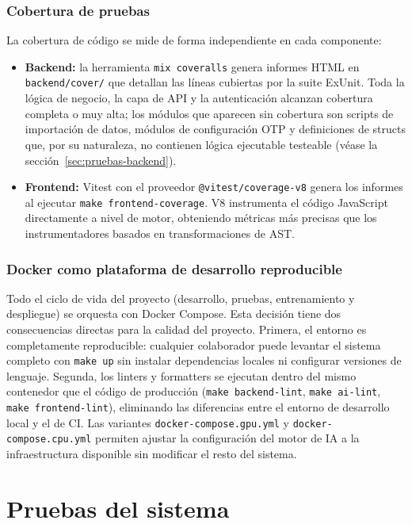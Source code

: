 \subsubsection{Cobertura de pruebas}

La cobertura de código se mide de forma independiente en cada componente:

\begin{itemize}
 \item \textbf{Backend:} la herramienta \texttt{mix coveralls} genera informes HTML en \texttt{backend/cover/} que detallan las líneas cubiertas por la suite ExUnit. Toda la lógica de negocio, la capa de API y la autenticación alcanzan cobertura completa o muy alta; los módulos que aparecen sin cobertura son scripts de importación de datos, módulos de configuración OTP y definiciones de structs que, por su naturaleza, no contienen lógica ejecutable testeable (véase la sección~\ref{sec:pruebas-backend}).
 \item \textbf{Frontend:} Vitest con el proveedor \texttt{@vitest/coverage-v8} genera los informes al ejecutar \texttt{make frontend-coverage}. V8 instrumenta el código JavaScript directamente a nivel de motor, obteniendo métricas más precisas que los instrumentadores basados en transformaciones de AST.
\end{itemize}

\subsubsection{Docker como plataforma de desarrollo reproducible}

Todo el ciclo de vida del proyecto (desarrollo, pruebas, entrenamiento y despliegue) se orquesta con Docker Compose. Esta decisión tiene dos consecuencias directas para la calidad del proyecto. Primera, el entorno es completamente reproducible: cualquier colaborador puede levantar el sistema completo con \texttt{make up} sin instalar dependencias locales ni configurar versiones de lenguaje. Segunda, los linters y formatters se ejecutan dentro del mismo contenedor que el código de producción (\texttt{make backend-lint}, \texttt{make ai-lint}, \texttt{make frontend-lint}), eliminando las diferencias entre el entorno de desarrollo local y el de CI. Las variantes \texttt{docker-compose.gpu.yml} y \texttt{docker-compose.cpu.yml} permiten ajustar la configuración del motor de IA a la infraestructura disponible sin modificar el resto del sistema.

\section{Pruebas del sistema}

